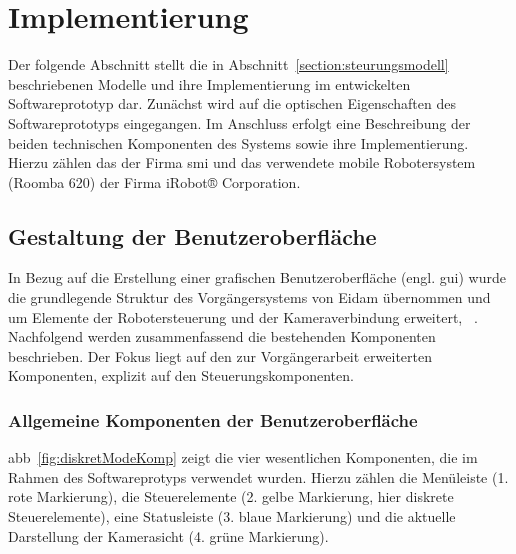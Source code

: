

\chapter{Implementierung}
\label{chapter:implementierung}
Der folgende Abschnitt stellt die in Abschnitt~\ref{section:steurungsmodell} beschriebenen Modelle und ihre Implementierung im entwickelten Softwareprototyp dar. Zunächst wird auf die optischen Eigenschaften des Softwareprototyps eingegangen. Im Anschluss erfolgt eine Beschreibung der beiden technischen Komponenten des Systems sowie ihre Implementierung. Hierzu zählen das \et \iV der Firma \acf{smi} und das verwendete mobile Robotersystem (Roomba 620) der Firma iRobot® Corporation.

\section{Gestaltung der Benutzeroberfläche}
\label{sect:gui}
In Bezug auf die Erstellung einer grafischen Benutzeroberfläche (engl. \acf{gui}) wurde die grundlegende Struktur des Vorgängersystems von Eidam übernommen und um Elemente der Robotersteuerung und der Kameraverbindung erweitert, \vgl~\cite{Eidam2015}. Nachfolgend werden zusammenfassend die bestehenden Komponenten beschrieben. Der Fokus liegt auf den zur Vorgängerarbeit erweiterten Komponenten, explizit auf den Steuerungskomponenten.

\subsection{Allgemeine Komponenten der Benutzeroberfläche}
\acl{abb}~\ref{fig:diskretModeKomp} zeigt die vier wesentlichen Komponenten, die im Rahmen des Softwareprotyps verwendet wurden. Hierzu zählen die Menüleiste (1. rote Markierung), die Steuerelemente (2. gelbe Markierung, hier diskrete Steuerelemente), eine Statusleiste (3. blaue Markierung) und die aktuelle Darstellung der Kamerasicht (4. grüne Markierung). %

